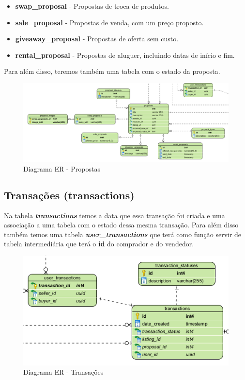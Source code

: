 \documentclass[a4paper, 12pt]{article} %
\begin{document}
\begin{itemize}
	\item \textbf{swap\_proposal} - Propostas de troca de produtos.
	\item \textbf{sale\_proposal} - Propostas de venda, com um preço proposto.
	\item \textbf{giveaway\_proposal} - Propostas de oferta sem custo.
	\item \textbf{rental\_proposal} - Propostas de aluguer, incluindo datas de início e fim.
\end{itemize}

Para além disso, teremos também uma tabela com o estado da proposta.

\begin{figure}[H]
	\centering
	\includegraphics[width=\textwidth]{../images/entity-relationship-diagram-proposals.png}
	\caption{Diagrama ER - Propostas}
	\label{fig:ER Proposals}
\end{figure}

\newpage

\subsection{\textbf{Transações (transactions)}}
Na tabela \textbf{\textit{transactions}} temos a data que essa transação foi criada e uma associação a uma tabela com o estado dessa mesma transação. Para além disso também temos uma tabela \textbf{\textit{user\_transactions}} que terá como função servir de tabela intermediária que terá o \textbf{id} do comprador e do vendedor. 
\begin{figure}[H]
	\centering
	\includegraphics[width=\textwidth]{../images/entity-relationship-diagram-transactions.png}
	\caption{Diagrama ER - Transações}
	\label{fig:diagrama_er}
\end{figure}
\end{document}
